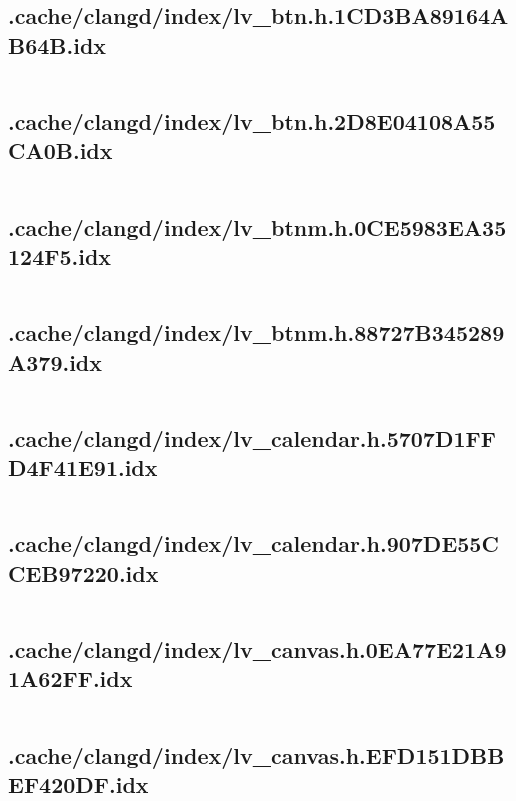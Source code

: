 \subsection{.cache/clangd/index/lv_btn.h.1CD3BA89164AB64B.idx}
\inputminted[linenos,tabsize=2,breaklines, breakanywhere]{c}{lv_btn.h.1CD3BA89164AB64B.idx}
\pagebreak

\subsection{.cache/clangd/index/lv_btn.h.2D8E04108A55CA0B.idx}
\inputminted[linenos,tabsize=2,breaklines, breakanywhere]{c}{lv_btn.h.2D8E04108A55CA0B.idx}
\pagebreak

\subsection{.cache/clangd/index/lv_btnm.h.0CE5983EA35124F5.idx}
\inputminted[linenos,tabsize=2,breaklines, breakanywhere]{c}{lv_btnm.h.0CE5983EA35124F5.idx}
\pagebreak

\subsection{.cache/clangd/index/lv_btnm.h.88727B345289A379.idx}
\inputminted[linenos,tabsize=2,breaklines, breakanywhere]{c}{lv_btnm.h.88727B345289A379.idx}
\pagebreak

\subsection{.cache/clangd/index/lv_calendar.h.5707D1FFD4F41E91.idx}
\inputminted[linenos,tabsize=2,breaklines, breakanywhere]{c}{lv_calendar.h.5707D1FFD4F41E91.idx}
\pagebreak

\subsection{.cache/clangd/index/lv_calendar.h.907DE55CCEB97220.idx}
\inputminted[linenos,tabsize=2,breaklines, breakanywhere]{c}{lv_calendar.h.907DE55CCEB97220.idx}
\pagebreak

\subsection{.cache/clangd/index/lv_canvas.h.0EA77E21A91A62FF.idx}
\inputminted[linenos,tabsize=2,breaklines, breakanywhere]{c}{lv_canvas.h.0EA77E21A91A62FF.idx}
\pagebreak

\subsection{.cache/clangd/index/lv_canvas.h.EFD151DBBEF420DF.idx}
\inputminted[linenos,tabsize=2,breaklines, breakanywhere]{c}{lv_canvas.h.EFD151DBBEF420DF.idx}
\pagebreak

